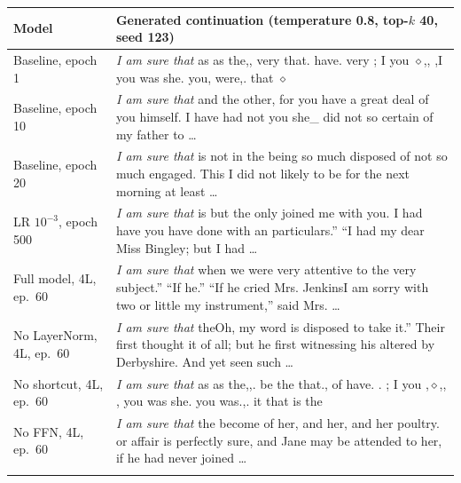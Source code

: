 \begin{tabularx}{\textwidth}{@{}p{3.6cm}X@{}}
\toprule
Model & Generated continuation (temperature 0.8, top-$k$ 40, seed 123) \\
\midrule
Baseline, epoch 1 & \emph{I am sure that} as as the,, very that. have. very ; I you $\diamond$,, ,I you was she. you, were,. that $\diamond$ \\ \addlinespace[2pt]
Baseline, epoch 10 & \emph{I am sure that} and the other, for you have a great deal of you himself. I have had not you she\_ did not so certain of my father to \ldots \\ \addlinespace[2pt]
Baseline, epoch 20 & \emph{I am sure that} is not in the being so much disposed of not so much engaged. This I did not likely to be for the next morning at least \ldots \\ \addlinespace[2pt]
LR $10^{-3}$, epoch 500 & \emph{I am sure that} is but the only joined me with you. I had have you have done with an particulars.” “I had my dear Miss Bingley; but I had \ldots \\ \addlinespace[2pt]
Full model, 4L, ep.\ 60 & \emph{I am sure that} when we were very attentive to the very subject.” “If he.” “If he cried Mrs. JenkinsI am sorry with two or little my instrument,” said Mrs. \ldots \\ \addlinespace[2pt]
No LayerNorm, 4L, ep.\ 60 & \emph{I am sure that} theOh, my word is disposed to take it.” Their first thought it of all; but he first witnessing his altered by Derbyshire. And yet seen such \ldots \\ \addlinespace[2pt]
No shortcut, 4L, ep.\ 60 & \emph{I am sure that} as as the,,. be the that., of have. . ; I you ,$\diamond$,, , you was she. you was.,. it that is the \\ \addlinespace[2pt]
No FFN, 4L, ep.\ 60 & \emph{I am sure that} the become of her, and her, and her poultry. or affair is perfectly sure, and Jane may be attended to her, if he had never joined \ldots \\ \addlinespace[2pt]
\bottomrule
\end{tabularx}
